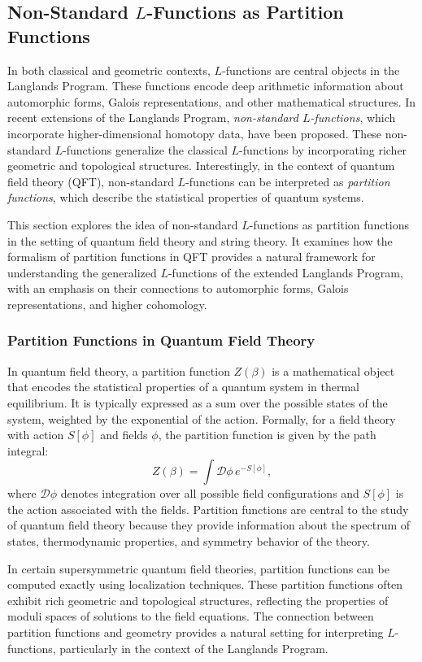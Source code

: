 \documentclass{article}
\theoremstyle{remark}
\begin{document}
\subsection{Non-Standard $L$-Functions as Partition Functions}

In both classical and geometric contexts, $L$-functions are central objects in the Langlands Program. These functions encode deep arithmetic information about automorphic forms, Galois representations, and other mathematical structures. In recent extensions of the Langlands Program, \emph{non-standard $L$-functions}, which incorporate higher-dimensional homotopy data, have been proposed. These non-standard $L$-functions generalize the classical $L$-functions by incorporating richer geometric and topological structures. Interestingly, in the context of quantum field theory (QFT), non-standard $L$-functions can be interpreted as \emph{partition functions}, which describe the statistical properties of quantum systems.

This section explores the idea of non-standard $L$-functions as partition functions in the setting of quantum field theory and string theory. It examines how the formalism of partition functions in QFT provides a natural framework for understanding the generalized $L$-functions of the extended Langlands Program, with an emphasis on their connections to automorphic forms, Galois representations, and higher cohomology.

\subsubsection{Partition Functions in Quantum Field Theory}

In quantum field theory, a partition function $Z(\beta)$ is a mathematical object that encodes the statistical properties of a quantum system in thermal equilibrium. It is typically expressed as a sum over the possible states of the system, weighted by the exponential of the action. Formally, for a field theory with action $S[\phi]$ and fields $\phi$, the partition function is given by the path integral:
\[
Z(\beta) = \int \mathcal{D} \phi \, e^{-S[\phi]},
\]
where $\mathcal{D} \phi$ denotes integration over all possible field configurations and $S[\phi]$ is the action associated with the fields. Partition functions are central to the study of quantum field theory because they provide information about the spectrum of states, thermodynamic properties, and symmetry behavior of the theory.

In certain supersymmetric quantum field theories, partition functions can be computed exactly using localization techniques. These partition functions often exhibit rich geometric and topological structures, reflecting the properties of moduli spaces of solutions to the field equations. The connection between partition functions and geometry provides a natural setting for interpreting $L$-functions, particularly in the context of the Langlands Program.
\end{document}
